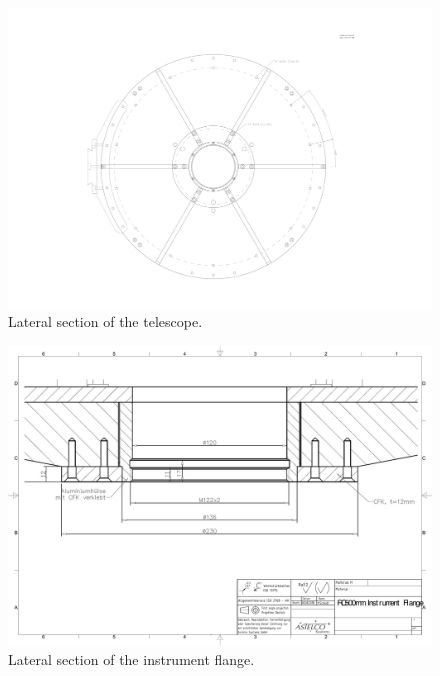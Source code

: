 \begin{figure}
\begin{center}
\includegraphics[height=1.0\linewidth,angle=90]{figures/telescope-primary-mirror-cell-rear}
\end{center}
\caption{Lateral section of the telescope.}
\label{figure:telescope-primary-mirror-cell-rear}
\end{figure}

\begin{figure}
\begin{center}
\includegraphics[height=1.0\linewidth,angle=90]{figures/telescope-instrument-flange-section.pdf}
\end{center}
\caption{Lateral section of the instrument flange.}
\label{figure:telescope-instrument-flange-section}
\end{figure}



